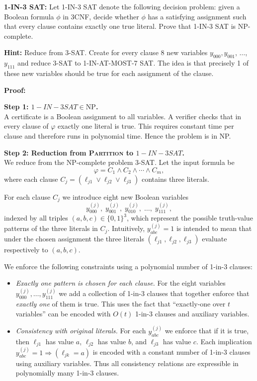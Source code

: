 \problem{}
\par \textbf{1-IN-3 SAT:} Let 1-IN-3 SAT denote the following decision problem: given a Boolean formula $\phi$ in 3CNF, decide whether $\phi$ has a satisfying assignment such that every clause contains exactly one true literal. Prove that 1-IN-3 SAT is NP-complete.

\par \textbf{Hint:} Reduce from 3-SAT. Create for every clause 8 new variables $y_{000}, y_{001}$, $\dots$, $y_{111}$ and reduce 3-SAT to 1-IN-AT-MOST-7 SAT. The idea is that precisely 1 of these new variables should be true for each assignment of the clause.

\noindent \textbf{Proof:}

\noindent\textbf{Step 1: \(1-IN-3 SAT \in \mathrm{NP}\).} \\
A certificate is a Boolean assignment to all variables.
A verifier checks that in every clause of $\varphi$ exactly one literal
is true. This requires constant time per clause and therefore runs in
polynomial time. Hence the problem is in NP.


\noindent\textbf{Step 2: Reduction from \textsc{Partition} to \(1-IN-3 SAT\).} \\

We reduce from the NP-complete problem \textsc{3-SAT}.
Let the input formula be
\[
\varphi = C_1 \land C_2 \land \cdots \land C_m,
\]
where each clause $C_j = (\ell_{j1} \lor \ell_{j2} \lor \ell_{j3})$
contains three literals.

For each clause $C_j$ we introduce eight new Boolean variables
\[
y_{000}^{(j)},\; y_{001}^{(j)},\; y_{010}^{(j)},\; \dots,\;
y_{111}^{(j)},
\]
indexed by all triples $(a,b,c) \in \{0,1\}^3$, which represent the
possible truth-value patterns of the three literals in $C_j$.  Intuitively,
$y_{abc}^{(j)} = 1$ is intended to mean that under the chosen assignment
the three literals $(\ell_{j1}, \ell_{j2}, \ell_{j3})$ evaluate
respectively to $(a,b,c)$.

We enforce the following constraints using a polynomial number of 
1-in-3 clauses:

\begin{itemize}
    \item \emph{Exactly one pattern is chosen for each clause.}
    For the eight variables $y_{000}^{(j)}, \dots, y_{111}^{(j)}$ we add
    a collection of 1-in-3 clauses that together enforce that
    \emph{exactly one} of them is true. This uses the fact that
    ``exactly-one over $t$ variables'' can be encoded with $O(t)$
    1-in-3 clauses and auxiliary variables.

    \item \emph{Consistency with original literals.}
    For each $y_{abc}^{(j)}$ we enforce that if it is true,
    then $\ell_{j1}$ has value $a$, $\ell_{j2}$ has value $b$, and
    $\ell_{j3}$ has value $c$. Each implication
    $y_{abc}^{(j)} =1 \Rightarrow (\ell_{jk} = a)$
    is encoded with a constant number of 1-in-3 clauses using auxiliary
    variables. Thus all consistency relations are expressible in
    polynomially many 1-in-3 clauses.
\end{itemize}

